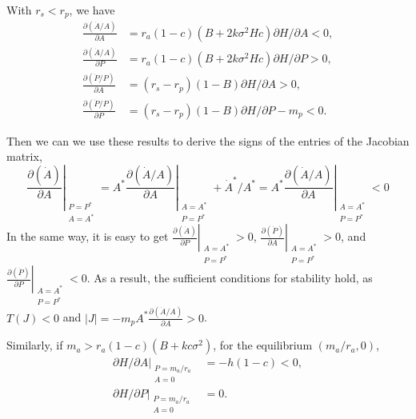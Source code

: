 \documentclass[12pt]{article}
\begin{document}
With $r_s<r_p$, we have
\begin{subequations}
\begin{align}
\label{eq:J11}
\frac{\partial (\dot{A}/A)}{\partial A} &= r_a (1-c) (B+2 k \sigma^2 H c) \partial H/\partial A < 0, \\
\label{eq:J12}
\frac{\partial (\dot{A}/A)}{\partial P} &= r_a (1-c) (B+2 k \sigma^2 H c) \partial H/\partial P > 0, \\ 
\label{eq:J21}
\frac{\partial (\dot{P}/P)}{\partial A} &= (r_s-r_p)(1-B)\partial H/\partial A  >0, \\
\label{eq:J22}
\frac{\partial (\dot{P}/P)}{\partial P} &= (r_s-r_p)(1-B)\partial H/\partial P -m_p <0 .
\end{align}
\end{subequations}

Then we can we use these results to derive the signs of the entries of the Jacobian matrix, 
\begin{equation}
\left.\frac{\partial (\dot{A})}{\partial A}\right|_{\substack{P=P^*\\ A=A^*}} = A^* \left.\frac{\partial (\dot{A}/A)}{\partial A}\right|_{\substack{A=A^*\\ P=P^*}} + \dot{A}^*/A^* = A^* \left.\frac{\partial (\dot{A}/A)}{\partial A}\right|_{\substack{A=A^*\\ P=P^*}} < 0
\end{equation}
In the same way, it is easy to get $\left.\frac{\partial (\dot{A})}{\partial P}\right|_{\substack{A=A^*\\ P=P^*}} >0$, 
$\left.\frac{\partial (\dot{P})}{\partial A}\right|_{\substack{A=A^*\\ P=P^*}} >0$, and $\left.\frac{\partial (\dot{P})}{\partial P}\right|_{\substack{A=A^*\\ P=P^*}} <0$. As a result, the sufficient conditions for stability hold, as $T(J)<0$ and $|J|=-m_p A^* \frac{\partial (\dot{A}/A)}{\partial A} >0$. 

Similarly, if $m_a>r_a(1-c)(B+k c \sigma^2)$, for the equilibrium $(m_a/r_a,0)$,
\begin{align}
\left.\partial H/\partial A \right|_{\substack{P=m_a/r_a\\ A=0}}&= -h (1-c)<0, \nonumber \\
\left.\partial H/\partial P \right|_{\substack{P=m_a/r_a\\ A=0}}&= 0 . \nonumber
\end{align}
\end{document}
